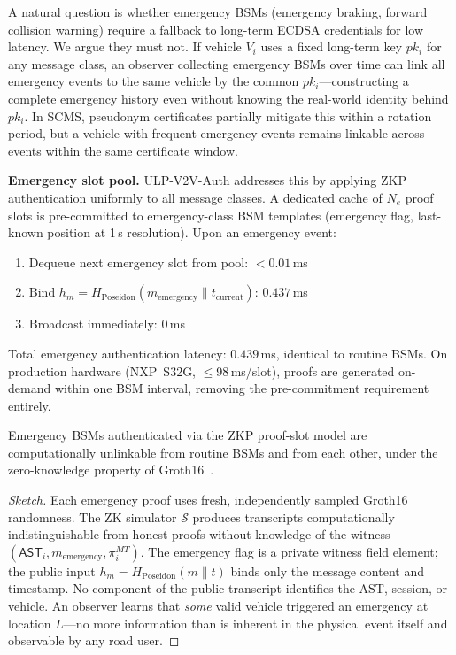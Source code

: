 A natural question is whether emergency BSMs (emergency braking, forward collision
warning) require a fallback to long-term ECDSA credentials for low latency. We
argue they must not. If vehicle $V_i$ uses a fixed long-term key $pk_i$ for any
message class, an observer collecting emergency BSMs over time can link all
emergency events to the same vehicle by the common $pk_i$---constructing a complete
emergency history even without knowing the real-world identity behind $pk_i$.
In SCMS, pseudonym certificates partially mitigate this within a rotation period,
but a vehicle with frequent emergency events remains linkable across events
within the same certificate window.

\textbf{Emergency slot pool.}
ULP-V2V-Auth addresses this by applying ZKP authentication uniformly to all
message classes. A dedicated cache of $N_e$ proof slots is pre-committed to
emergency-class BSM templates (emergency flag, last-known position at 1\,s
resolution). Upon an emergency event:
\begin{enumerate}
    \item Dequeue next emergency slot from pool: $< 0.01$\,ms
    \item Bind $h_m = H_{\text{Poseidon}}(m_{\text{emergency}} \| t_{\text{current}})$: $0.437$\,ms
    \item Broadcast immediately: $0$\,ms
\end{enumerate}
Total emergency authentication latency: $\mathbf{0.439}$\,ms, identical to routine
BSMs. On production hardware (NXP~S32G, $\leq$98\,ms/slot), proofs are generated
on-demand within one BSM interval, removing the pre-commitment requirement entirely.

\begin{theorem}
Emergency BSMs authenticated via the ZKP proof-slot model are computationally
unlinkable from routine BSMs and from each other, under the zero-knowledge
property of Groth16~\cite{groth2016}.
\end{theorem}
\begin{proof}[Sketch]
Each emergency proof uses fresh, independently sampled Groth16 randomness. The
ZK simulator $\mathcal{S}$ produces transcripts computationally indistinguishable
from honest proofs without knowledge of the witness $(\mathsf{AST}_i,
m_{\text{emergency}}, \pi^{MT}_i)$. The emergency flag is a private witness field
element; the public input $h_m = H_{\text{Poseidon}}(m \| t)$ binds only the
message content and timestamp. No component of the public transcript identifies
the AST, session, or vehicle. An observer learns that \emph{some} valid vehicle
triggered an emergency at location $L$---no more information than is inherent in
the physical event itself and observable by any road user.
\end{proof}

